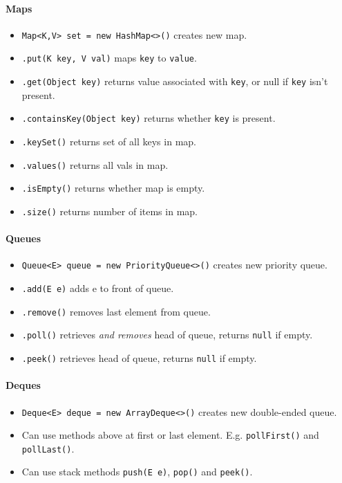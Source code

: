 \documentclass[twocolumn,english]{article}
\begin{document}
\paragraph{Maps}
\begin{itemize}
\item \texttt{Map\textless{}K,V\textgreater{} set = new HashMap\textless{}\textgreater{}()}
creates new map.
\item \texttt{.put(K key, V val)} maps \texttt{key} to \texttt{value}.
\item \texttt{.get(Object key)} returns value associated with \texttt{key},
or null if \texttt{key} isn't present.
\item \texttt{.containsKey(Object key)} returns whether \texttt{key} is
present.
\item \texttt{.keySet()} returns set of all keys in map.
\item \texttt{.values()} returns all vals in map.
\item \texttt{.isEmpty()} returns whether map is empty.
\item \texttt{.size()} returns number of items in map.
\end{itemize}

\paragraph{Queues}
\begin{itemize}
\item \texttt{Queue\textless{}E\textgreater{} queue = new PriorityQueue\textless{}\textgreater{}()}
creates new priority queue.
\item \texttt{.add(E e)} adds e to front of queue.
\item \texttt{.remove()} removes last element from queue.
\item \texttt{.poll()} retrieves \emph{and removes} head of queue, returns
\texttt{null} if empty.
\item \texttt{.peek()} retrieves head of queue, returns \texttt{null} if
empty.
\end{itemize}

\paragraph{Deques}
\begin{itemize}
\item \texttt{Deque\textless{}E\textgreater{} deque = new ArrayDeque\textless{}\textgreater{}()}
creates new double-ended queue.
\item Can use methods above at first or last element. E.g. \texttt{pollFirst()}
and \texttt{pollLast()}.
\item Can use stack methods \texttt{push(E e)}, \texttt{pop()} and \texttt{peek()}.
\end{itemize}
\end{document}
